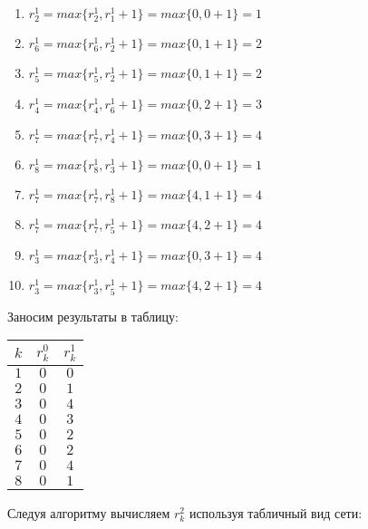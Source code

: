 \begin{enumerate}[nosep]
	\item $r_2^1 = max\{r_2^1, r_1^1 + 1\} = max\{0,0+1\} = 1$
	\item $r_6^1 = max\{r_6^1, r_2^1 + 1\} = max\{0,1+1\} = 2$
	\item $r_5^1 = max\{r_5^1, r_2^1 + 1\} = max\{0,1+1\} = 2$
	\item $r_4^1 = max\{r_4^1, r_6^1 + 1\} = max\{0,2+1\} = 3$
	\item $r_7^1 = max\{r_7^1, r_4^1 + 1\} = max\{0,3+1\} = 4$
	\item $r_8^1 = max\{r_8^1, r_3^1 + 1\} = max\{0,0+1\} = 1$
	\item $r_7^1 = max\{r_7^1, r_8^1 + 1\} = max\{4,1+1\} = 4$
	\item $r_7^1 = max\{r_7^1, r_5^1 + 1\} = max\{4,2+1\} = 4$
	\item $r_3^1 = max\{r_3^1, r_4^1 + 1\} = max\{0,3+1\} = 4$
	\item $r_3^1 = max\{r_3^1, r_5^1 + 1\} = max\{4,2+1\} = 4$
\end{enumerate}

Заносим результаты в таблицу:


\begin{table}[H]
	\centering
	\begin{tabular}{ | c | c | c | } 
		\hline
		$k$ & $r_k^0$ & $r_k^1$ \\ \hline
		$1$ & $0$ & $0$ \\ \hline
		$2$ & $0$ & $1$ \\ \hline
		$3$ & $0$ & $4$ \\ \hline
		$4$ & $0$ & $3$ \\ \hline
		$5$ & $0$ & $2$ \\ \hline
		$6$ & $0$ & $2$ \\ \hline
		$7$ & $0$ & $4$ \\ \hline
		$8$ & $0$ & $1$ \\ \hline
	\end{tabular}
\end{table}

\bigskip


\bigskip

Следуя алгоритму вычисляем $r^2_k$ используя табличный вид сети:

